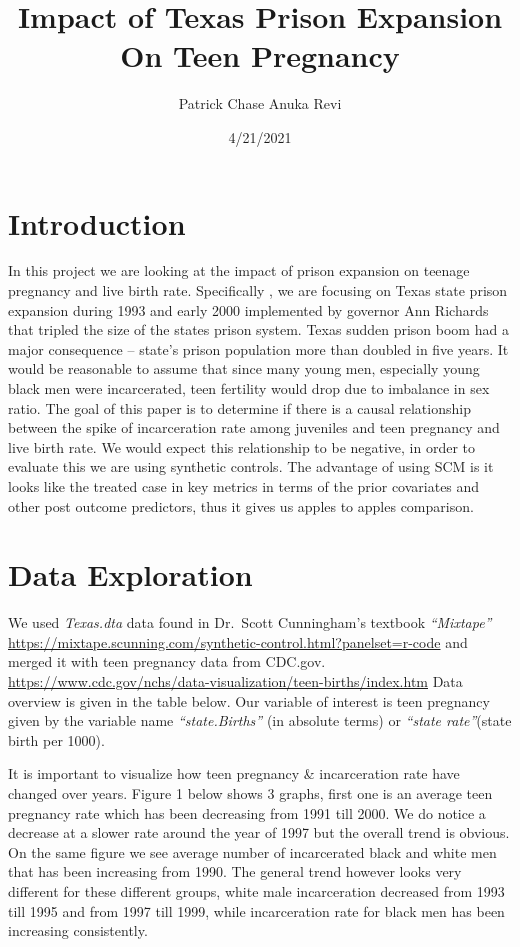 \documentclass[
]{article}
\title{Impact of Texas Prison Expansion On Teen Pregnancy}
\author{Patrick Chase Anuka Revi}
\date{4/21/2021}
\begin{document}
\maketitle

\hypertarget{introduction}{%
\section{\texorpdfstring{\textbf{Introduction}}{Introduction}}\label{introduction}}

In this project we are looking at the impact of prison expansion on
teenage pregnancy and live birth rate. Specifically , we are focusing on
Texas state prison expansion during 1993 and early 2000 implemented by
governor Ann Richards that tripled the size of the states prison system.
Texas sudden prison boom had a major consequence -- state's prison
population more than doubled in five years. It would be reasonable to
assume that since many young men, especially young black men were
incarcerated, teen fertility would drop due to imbalance in sex ratio.
The goal of this paper is to determine if there is a causal relationship
between the spike of incarceration rate among juveniles and teen
pregnancy and live birth rate. We would expect this relationship to be
negative, in order to evaluate this we are using synthetic controls. The
advantage of using SCM is it looks like the treated case in key metrics
in terms of the prior covariates and other post outcome predictors, thus
it gives us apples to apples comparison.

\hypertarget{data-exploration}{%
\section{\texorpdfstring{\textbf{Data
Exploration}}{Data Exploration}}\label{data-exploration}}

We used \emph{Texas.dta} data found in Dr.~Scott Cunningham's textbook
\emph{``Mixtape''}
\url{https://mixtape.scunning.com/synthetic-control.html?panelset=r-code}
and merged it with teen pregnancy data from CDC.gov.
\url{https://www.cdc.gov/nchs/data-visualization/teen-births/index.htm}
Data overview is given in the table below. Our variable of interest is
teen pregnancy given by the variable name \emph{``state.Births''} (in
absolute terms) or \emph{``state rate''}(state birth per 1000).

It is important to visualize how teen pregnancy \& incarceration rate
have changed over years. Figure 1 below shows 3 graphs, first one is an
average teen pregnancy rate which has been decreasing from 1991 till
2000. We do notice a decrease at a slower rate around the year of 1997
but the overall trend is obvious. On the same figure we see average
number of incarcerated black and white men that has been increasing from
1990. The general trend however looks very different for these different
groups, white male incarceration decreased from 1993 till 1995 and from
1997 till 1999, while incarceration rate for black men has been
increasing consistently.
\end{document}
